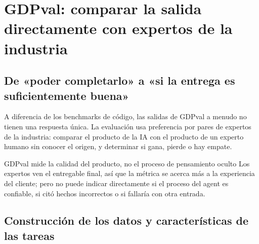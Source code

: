 \section{GDPval: comparar la salida directamente con expertos de la industria}

\subsection{De «poder completarlo» a «si la entrega es suficientemente buena»}




A diferencia de los benchmarks de código, las salidas de GDPval a menudo no tienen una respuesta única. La evaluación usa preferencia por pares de expertos de la industria: comparar el producto de la IA con el producto de un experto humano sin conocer el origen, y determinar si gana, pierde o hay empate.

\begin{importantbox}{GDPval mide la calidad del producto, no el proceso de pensamiento oculto}
Los expertos ven el entregable final, así que la métrica se acerca más a la experiencia del cliente; pero no puede indicar directamente si el proceso del agent es confiable, si citó hechos incorrectos o si fallaría con otra entrada.
\end{importantbox}

\subsection{Construcción de los datos y características de las tareas}


